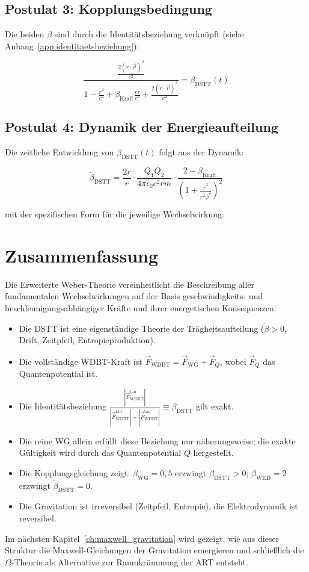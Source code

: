 \subsection{Postulat 3: Kopplungsbedingung}
\label{sub:postulat3}

Die beiden \(\beta\) sind durch die Identitätsbeziehung verknüpft (siehe Anhang~\ref{app:identitaetsbeziehung}):

\[
\frac{\frac{2(\dot{r} \cdot \vec{v})^2}{c^2}}{1 - \frac{\dot{r}^2}{c^2} + \beta_{\text{Kraft}} \frac{r \ddot{r}}{c^2} + \frac{2(\dot{r} \cdot \vec{v})^2}{c^2}} = \beta_{\text{DSTT}}(t)
\]

\subsection{Postulat 4: Dynamik der Energieaufteilung}
\label{sub:postulat4}

Die zeitliche Entwicklung von \(\beta_{\text{DSTT}}(t)\) folgt aus der Dynamik:

\[
\dot{\beta}_{\text{DSTT}} = \frac{2\dot{r}}{r} \cdot \frac{Q_1 Q_2}{4\pi \epsilon_0 c^2 r m} \cdot \frac{2 - \beta_{\text{Kraft}}}{\left(1 + \frac{\dot{r}^2}{r^2 \dot{\phi}^2}\right)^2}
\]

mit der spezifischen Form für die jeweilige Wechselwirkung.

\section{Zusammenfassung}
\label{sec:dstt_zusammenfassung}

Die Erweiterte Weber-Theorie vereinheitlicht die Beschreibung aller fundamentalen Wechselwirkungen auf der Basis geschwindigkeits- und beschleunigungsabhängiger Kräfte und ihrer energetischen Konsequenzen:

\begin{itemize}
    \item Die DSTT ist eine eigenständige Theorie der Trägheitsaufteilung (\(\dot{\beta} > 0\), Drift, Zeitpfeil, Entropieproduktion).
    \item Die vollständige WDBT-Kraft ist \(\vec{F}_{\text{WDBT}} = \vec{F}_{\text{WG}} + \vec{F}_Q\), wobei \(\vec{F}_Q\) das Quantenpotential ist.
    \item Die Identitätsbeziehung \(\displaystyle \frac{|\vec{F}_{\text{WDBT}}^{\text{tan}}|}{|\vec{F}_{\text{WDBT}}^{\text{rad}}| + |\vec{F}_{\text{WDBT}}^{\text{tan}}|} \equiv \beta_{\text{DSTT}}\) gilt exakt.
    \item Die reine WG allein erfüllt diese Beziehung nur näherungsweise; die exakte Gültigkeit wird durch das Quantenpotential \(Q\) hergestellt.
    \item Die Kopplungsgleichung zeigt: \(\beta_{\text{WG}} = 0,5\) erzwingt \(\dot{\beta}_{\text{DSTT}} > 0\); \(\beta_{\text{WED}} = 2\) erzwingt \(\dot{\beta}_{\text{DSTT}} = 0\).
    \item Die Gravitation ist irreversibel (Zeitpfeil, Entropie), die Elektrodynamik ist reversibel.
\end{itemize}

Im nächsten Kapitel~\ref{ch:maxwell_gravitation} wird gezeigt, wie aus dieser Struktur die Maxwell-Gleichungen der Gravitation emergieren und schließlich die \(\Omega\)-Theorie als Alternative zur Raumkrümmung der ART entsteht.